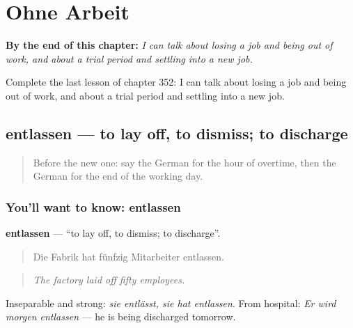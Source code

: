 
\chapter{Ohne Arbeit}
\label{ch:ge-ohne-arbeit}

\begin{chapteropening}
\textbf{By the end of this chapter:} \emph{I can talk about losing a job and being out of work, and about a trial period and settling into a new job.}

Complete the last lesson of chapter 352: I can talk about losing a job and being out of work, and about a trial period and settling into a new job.
\end{chapteropening}

\section[entlassen]{entlassen — to lay off, to dismiss; to discharge}

\label{lesson:GE-C352-entlassen}



\begin{quote}
Before the new one: say the German for the hour of overtime, then the German for the end of the working day.
\end{quote}

\subsection*{You'll want to know: entlassen}
\textbf{entlassen} — \textquotedblleft{}to lay off, to dismiss; to discharge\textquotedblright{}.

\begin{quote}
Die Fabrik hat fünfzig Mitarbeiter entlassen.
\end{quote}

\begin{quote}
\emph{The factory laid off fifty employees.}
\end{quote}

Inseparable and strong: \emph{sie entlässt, sie hat entlassen}. From hospital: \emph{Er wird morgen entlassen} — he is being discharged tomorrow.


